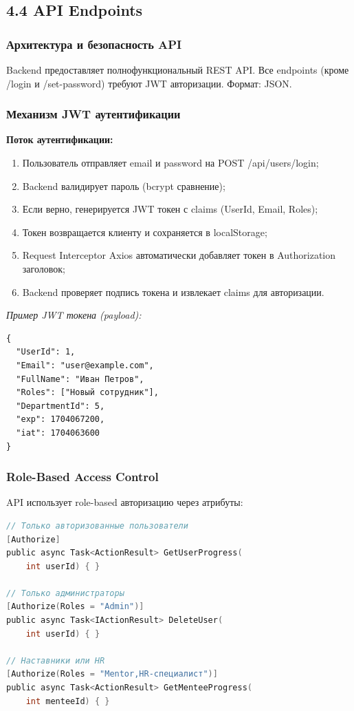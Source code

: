 \subsection{4.4 API Endpoints}

\subsubsection{Архитектура и безопасность API}

Backend предоставляет полнофункциональный REST API. Все endpoints (кроме /login и /set-password) требуют JWT авторизации. Формат: JSON.

\subsubsection{Механизм JWT аутентификации}

\textbf{Поток аутентификации:}

\begin{enumerate}
    \item Пользователь отправляет email и password на POST /api/users/login;
    \item Backend валидирует пароль (bcrypt сравнение);
    \item Если верно, генерируется JWT токен с claims (UserId, Email, Roles);
    \item Токен возвращается клиенту и сохраняется в localStorage;
    \item Request Interceptor Axios автоматически добавляет токен в Authorization заголовок;
    \item Backend проверяет подпись токена и извлекает claims для авторизации.
\end{enumerate}

\textit{Пример JWT токена (payload):}
\begin{lstlisting}[basicstyle=\ttfamily\small]
{
  "UserId": 1,
  "Email": "user@example.com",
  "FullName": "Иван Петров",
  "Roles": ["Новый сотрудник"],
  "DepartmentId": 5,
  "exp": 1704067200,
  "iat": 1704063600
}
\end{lstlisting}

\subsubsection{Role-Based Access Control}

API использует role-based авторизацию через атрибуты:

\begin{lstlisting}[language=C, basicstyle=\ttfamily\small]
// Только авторизованные пользователи
[Authorize]
public async Task<ActionResult> GetUserProgress(
    int userId) { }

// Только администраторы
[Authorize(Roles = "Admin")]
public async Task<IActionResult> DeleteUser(
    int userId) { }

// Наставники или HR
[Authorize(Roles = "Mentor,HR-специалист")]
public async Task<ActionResult> GetMenteeProgress(
    int menteeId) { }
\end{lstlisting}

